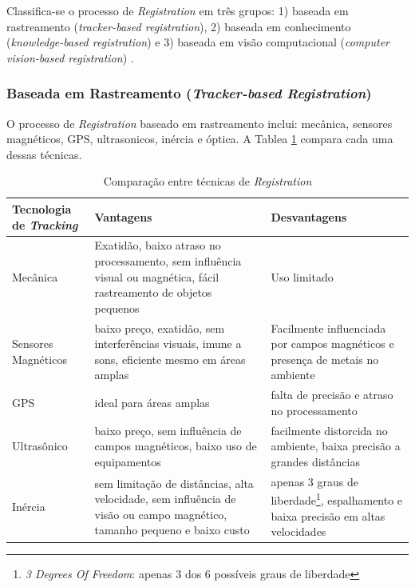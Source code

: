 Classifica-se o processo de \textit{Registration} em três grupos: 1) baseada em
rastreamento (\textit{tracker-based registration}), 2) baseada em conhecimento
(\textit{knowledge-based registration}) e 3) baseada em visão computacional
(\textit{computer vision-based registration}) \cite{DevActuallyRegistration}.



\subsubsection{Baseada em Rastreamento (\textit{Tracker-based Registration})}


O processo de \textit{Registration} baseado em rastreamento inclui: mecânica,
sensores magnéticos, GPS, ultrasonicos, inércia e óptica. A Tablea \ref{tab:track-reg-comp}
compara cada uma dessas técnicas.

\begin{table}[h!]
    \caption{Comparação entre técnicas de \textit{Registration}}
    \label{tab:track-reg-comp}
    \begin{tabular}{| p{5cm} | p{5cm} | p{5cm} |}
        \hline
        Tecnologia de \textit{Tracking} & Vantagens & Desvantagens \\
        \hline
        Mecânica & Exatidão, baixo atraso no processamento, sem influência visual ou magnética, fácil rastreamento de objetos pequenos & Uso limitado \\
        \hline
        Sensores Magnéticos & baixo preço, exatidão, sem interferências visuais, imune a sons, eficiente mesmo em áreas amplas & Facilmente influenciada por campos magnéticos e presença de metais no ambiente \\
        \hline
        GPS & ideal para áreas amplas & falta de precisão e atraso no processamento \\
        \hline
        Ultrasônico & baixo preço, sem influência de campos magnéticos, baixo uso de equipamentos & facilmente distorcida no ambiente, baixa precisão a grandes distâncias \\
        \hline
        Inércia & sem limitação de distâncias, alta velocidade, sem influência de visão ou campo magnético, tamanho pequeno e baixo custo & apenas 3 graus de liberdade\footnote{\textit{3 Degrees Of Freedom}: apenas 3 dos 6 possíveis graus de liberdade}, espalhamento e baixa precisão em altas velocidades \\
        \hline
    \end{tabular}
\end{table}




